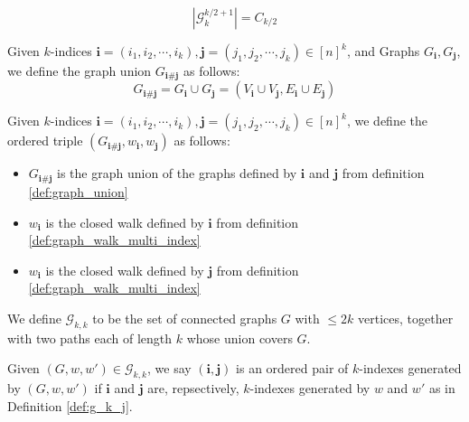\begin{proposition}
    \notready
    \label{prop:graph_Catalan_number}
  \[|\mathcal{G}^{k/2 + 1}_k| = C_{k/2}\]
\end{proposition}


\begin{definition}
  \label{def:graph_union}
  \notready
  Given $k$-indices $\mathbf{i} = (i_1, i_2, \cdots , i_{k}), \mathbf{j} = (j_1, j_2, \cdots , j_{k}) \in [n]^{k}$, and Graphs $G_{\mathbf{i}}, G_{\mathbf{j}}$, we define the graph union $G_{\mathbf{i} \# \mathbf{j}}$ as follows:
  $$
  G_{\mathbf{i} \# \mathbf{j}}  = G_{\mathbf{i}} \cup G_{\mathbf{j}} = (V_{\mathbf{i}} \cup V_{\mathbf{j}}, E_{\mathbf{i}} \cup E_{\mathbf{j}})
  $$
\end{definition}


\begin{definition}
  \label{def:ordered_triple}
  \notready
  Given $k$-indices $\mathbf{i} = (i_1, i_2, \cdots , i_{k}), \mathbf{j} = (j_1, j_2, \cdots , j_{k}) \in [n]^{k}$, we define the ordered triple $(G_{\mathbf{i} \# \mathbf{j}}, w_{\mathbf{i}}, w_{\mathbf{j}})$ as follows:
  \begin{itemize}
      \item $G_{\mathbf{i} \# \mathbf{j}}$ is the graph union of the graphs defined by $\mathbf{i}$ and $\mathbf{j}$ from definition \ref{def:graph_union}
      \item $w_{\mathbf{i}}$ is the closed walk defined by $\mathbf{i}$ from definition \ref{def:graph_walk_multi_index}
      \item $w_{\mathbf{i}}$ is the closed walk defined by $\mathbf{j}$ from definition \ref{def:graph_walk_multi_index}
  \end{itemize}
\end{definition}


\begin{definition}
  \notready
  \label{def:graph_walk_triple_set}
  \uses{} %
  We define $\mathcal{G}_{k,k}$ to be the set of connected graphs $G$ with $\leq 2k$ vertices,
  together with two paths each of length $k$ whose union covers $G$.
\end{definition}


\begin{definition}
  \notready
  \label{def:index_pair}
  Given $(G,w,w') \in \mathcal{G}_{k,k}$, we say $(\mathbf{i},\mathbf{j})$ is an ordered pair of $k$-indexes generated by $(G,w,w')$
  if $\mathbf{i}$ and $\mathbf{j}$ are, repsectively, $k$-indexes generated by $w$ and $w'$ as in Definition \ref{def:g_k_j}.
\end{definition}


